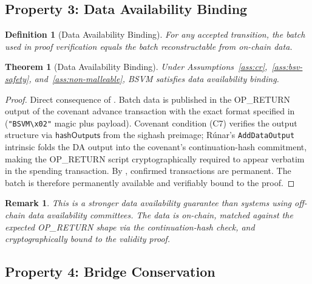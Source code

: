 \documentclass[11pt,a4paper]{article}
\newtheorem{definition}{Definition}[section]
\newtheorem{theorem}{Theorem}[section]
\newtheorem{remark}{Remark}[section]
\begin{document}
\subsection{Property 3: Data Availability Binding}

\begin{definition}[Data Availability Binding]\label{def:da}
For any accepted transition, the batch used in proof verification equals the batch reconstructable from on-chain data.
\end{definition}

\begin{theorem}[Data Availability Binding]\label{thm:da}
Under Assumptions~\ref{ass:cr},~\ref{ass:bsv-safety}, and~\ref{ass:non-malleable}, BSVM satisfies data availability binding.
\end{theorem}

\begin{proof}
Direct consequence of . Batch data is published in the OP\_RETURN output of the covenant advance transaction with the exact format specified in  (\texttt{"BSVM\textbackslash x02"} magic plus payload). Covenant condition (C7) verifies the output structure via $\mathsf{hashOutputs}$ from the sighash preimage; R\'{u}nar's \texttt{AddDataOutput} intrinsic folds the DA output into the covenant's continuation-hash commitment, making the OP\_RETURN script cryptographically required to appear verbatim in the spending transaction. By , confirmed transactions are permanent. The batch is therefore permanently available and verifiably bound to the proof. \qedhere
\end{proof}

\begin{remark}
This is a stronger data availability guarantee than systems using off-chain data availability committees. The data is on-chain, matched against the expected OP\_RETURN shape via the continuation-hash check, and cryptographically bound to the validity proof.
\end{remark}


\subsection{Property 4: Bridge Conservation}
\end{document}
